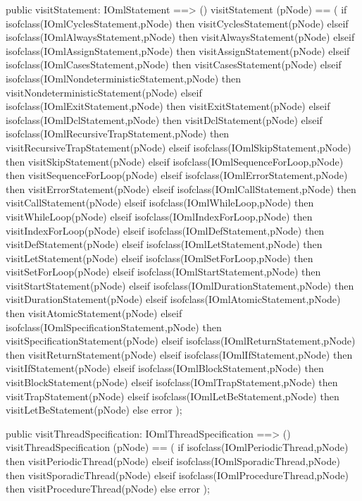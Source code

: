 \begin{vdm_al}
  public visitStatement: IOmlStatement ==> ()
  visitStatement (pNode) ==
    ( if isofclass(IOmlCyclesStatement,pNode) then visitCyclesStatement(pNode)
      elseif isofclass(IOmlAlwaysStatement,pNode) then visitAlwaysStatement(pNode)
      elseif isofclass(IOmlAssignStatement,pNode) then visitAssignStatement(pNode)
      elseif isofclass(IOmlCasesStatement,pNode) then visitCasesStatement(pNode)
      elseif isofclass(IOmlNondeterministicStatement,pNode) then visitNondeterministicStatement(pNode)
      elseif isofclass(IOmlExitStatement,pNode) then visitExitStatement(pNode)
      elseif isofclass(IOmlDclStatement,pNode) then visitDclStatement(pNode)
      elseif isofclass(IOmlRecursiveTrapStatement,pNode) then visitRecursiveTrapStatement(pNode)
      elseif isofclass(IOmlSkipStatement,pNode) then visitSkipStatement(pNode)
      elseif isofclass(IOmlSequenceForLoop,pNode) then visitSequenceForLoop(pNode)
      elseif isofclass(IOmlErrorStatement,pNode) then visitErrorStatement(pNode)
      elseif isofclass(IOmlCallStatement,pNode) then visitCallStatement(pNode)
      elseif isofclass(IOmlWhileLoop,pNode) then visitWhileLoop(pNode)
      elseif isofclass(IOmlIndexForLoop,pNode) then visitIndexForLoop(pNode)
      elseif isofclass(IOmlDefStatement,pNode) then visitDefStatement(pNode)
      elseif isofclass(IOmlLetStatement,pNode) then visitLetStatement(pNode)
      elseif isofclass(IOmlSetForLoop,pNode) then visitSetForLoop(pNode)
      elseif isofclass(IOmlStartStatement,pNode) then visitStartStatement(pNode)
      elseif isofclass(IOmlDurationStatement,pNode) then visitDurationStatement(pNode)
      elseif isofclass(IOmlAtomicStatement,pNode) then visitAtomicStatement(pNode)
      elseif isofclass(IOmlSpecificationStatement,pNode) then visitSpecificationStatement(pNode)
      elseif isofclass(IOmlReturnStatement,pNode) then visitReturnStatement(pNode)
      elseif isofclass(IOmlIfStatement,pNode) then visitIfStatement(pNode)
      elseif isofclass(IOmlBlockStatement,pNode) then visitBlockStatement(pNode)
      elseif isofclass(IOmlTrapStatement,pNode) then visitTrapStatement(pNode)
      elseif isofclass(IOmlLetBeStatement,pNode) then visitLetBeStatement(pNode)
      else error );

  public visitThreadSpecification: IOmlThreadSpecification ==> ()
  visitThreadSpecification (pNode) ==
    ( if isofclass(IOmlPeriodicThread,pNode) then visitPeriodicThread(pNode)
      elseif isofclass(IOmlSporadicThread,pNode) then visitSporadicThread(pNode)
      elseif isofclass(IOmlProcedureThread,pNode) then visitProcedureThread(pNode)
      else error );


\end{vdm_al}
